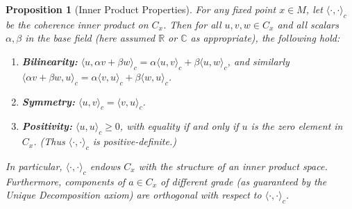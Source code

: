 \documentclass[11pt]{article}
\newtheorem{proposition}[theorem]{Proposition}
\begin{document}
\begin{proposition}[Inner Product Properties]
For any fixed point $x\in M$, let $\langle\cdot,\cdot\rangle_c$ be the coherence inner product on $C_x$. Then for all $u,v,w \in C_x$ and all scalars $\alpha,\beta$ in the base field (here assumed $\mathbb{R}$ or $\mathbb{C}$ as appropriate), the following hold:
\begin{enumerate}
    \item \textbf{Bilinearity:} $\langle u, \alpha v + \beta w\rangle_c = \alpha\langle u,v\rangle_c + \beta\langle u,w\rangle_c$, and similarly $\langle \alpha v + \beta w, u\rangle_c = \alpha\langle v,u\rangle_c + \beta\langle w,u\rangle_c$.
    \item \textbf{Symmetry:} $\langle u, v\rangle_c = \langle v, u\rangle_c$.
    \item \textbf{Positivity:} $\langle u, u\rangle_c \ge 0$, with equality if and only if $u$ is the zero element in $C_x$. (Thus $\langle\cdot,\cdot\rangle_c$ is positive-definite.)
\end{enumerate}
In particular, $\langle\cdot,\cdot\rangle_c$ endows $C_x$ with the structure of an inner product space. Furthermore, components of $a\in C_x$ of different grade (as guaranteed by the Unique Decomposition axiom) are orthogonal with respect to $\langle\cdot,\cdot\rangle_c$.
\end{proposition}
\end{document}
